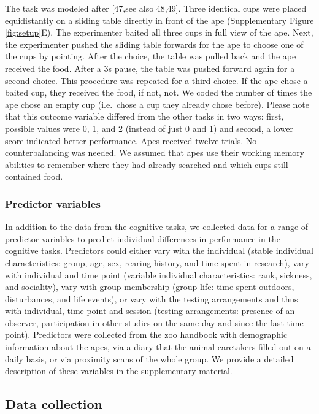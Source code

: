 \documentclass[
  man,floatsintext]{apa6}
\begin{document}
The task was modeled after {[}47,see also 48,49{]}. Three identical cups were placed equidistantly on a sliding table directly in front of the ape (Supplementary Figure \ref{fig:setup}E). The experimenter baited all three cups in full view of the ape. Next, the experimenter pushed the sliding table forwards for the ape to choose one of the cups by pointing. After the choice, the table was pulled back and the ape received the food. After a 3s pause, the table was pushed forward again for a second choice. This procedure was repeated for a third choice. If the ape chose a baited cup, they received the food, if not, not. We coded the number of times the ape chose an empty cup (i.e.~chose a cup they already chose before). Please note that this outcome variable differed from the other tasks in two ways: first, possible values were 0, 1, and 2 (instead of just 0 and 1) and second, a lower score indicated better performance. Apes received twelve trials. No counterbalancing was needed. We assumed that apes use their working memory abilities to remember where they had already searched and which cups still contained food.

\subsubsection{Predictor variables}\label{predictor-variables}

In addition to the data from the cognitive tasks, we collected data for a range of predictor variables to predict individual differences in performance in the cognitive tasks. Predictors could either vary with the individual (stable individual characteristics: group, age, sex, rearing history, and time spent in research), vary with individual and time point (variable individual characteristics: rank, sickness, and sociality), vary with group membership (group life: time spent outdoors, disturbances, and life events), or vary with the testing arrangements and thus with individual, time point and session (testing arrangements: presence of an observer, participation in other studies on the same day and since the last time point). Predictors were collected from the zoo handbook with demographic information about the apes, via a diary that the animal caretakers filled out on a daily basis, or via proximity scans of the whole group. We provide a detailed description of these variables in the supplementary material.

\subsection{Data collection}\label{data-collection}
\end{document}
